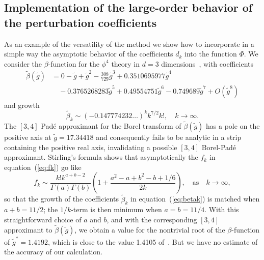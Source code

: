\documentclass[12pt]{iopart}
\begin{document}
\subsection{Implementation of the large-order behavior of the perturbation coefficients}
As an example of the versatility of the method we show how to incorporate in a simple way the asymptotic
behavior of the coefficients $d_k$ into the function $\Phi$. We consider the $\beta$-function for the $\phi^4$ theory in
$d=3$ dimensions~\cite{ZJ10}, with coefficients
%
\begin{eqnarray}
	\tilde{\beta}(\tilde{g}) & = 0 - \tilde{g} + \tilde{g}^2 - \frac{308}{729} \tilde{g}^3
		+ 0.3510695977 \tilde{g}^4 
\nonumber \\
		& \quad  - 0.3765268283  \tilde{g}^5  + 0.49554751   \tilde{g}^6
                               - 0.749689   \tilde{g}^7   + O(\tilde{g}^8)
\end{eqnarray}
and growth
\begin{equation}
	\label{eq:betak}
	\tilde{\beta}_k
	\sim (-0.147774232\ldots)^k k^{7/2} k!,
	\quad
	k\to\infty.
\end{equation}
%
The $[3,4]$ Pad\'e approximant for the Borel transform of $\tilde{\beta}(\tilde{g})$ has a pole on the positive axis at $\tilde{g}=17.34418$ and consequently fails to be analytic in a strip containing the positive real axis, invalidating a possible $[3,4]$ Borel-Pad\'e approximant.
%
Stirling's formula shows that asymptotically the $f_k$ in equation~(\ref{eq:fk}) go like
\begin{equation}
	f_k \sim 
	\frac{ k! k^{a+b-2} }{ \Gamma(a)\Gamma(b) }
	\left(1+ \frac{a^2-a+b^2-b +1/6 }{2k} \right)
	,
\quad\mathrm{as }\quad
	k\to\infty,
\end{equation}
so that the growth of the coefficients $\tilde{\beta}_k$ in equation~(\ref{eq:betak}) is matched when
$a+b=11/2$; the $1/k$-term is then minimum when $a=b=11/4$.
With this straightforward choice of $a$ and $b$, and with the corresponding $[3,4]$ approximant
to $\tilde{\beta}(\tilde{g})$, we obtain a value for the nontrivial root of the $\beta$-function
of $\tilde{g}^*=1.4192$, which is close to the value 1.4105 of~\cite{ZJ10}. But we have no estimate of the accuracy of our calculation.
\end{document}

